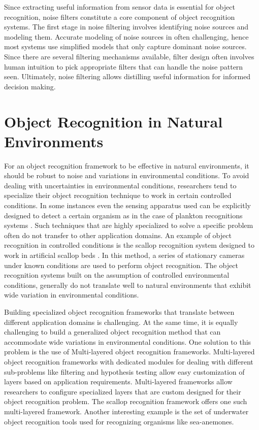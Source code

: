 \documentclass {udthesis}
\begin{document}
Since extracting useful information from sensor data is essential for object recognition, noise filters constitute a core component of object recognition systems. The first stage in noise filtering involves identifying noise sources and modeling them. Accurate modeling of noise sources in often challenging, hence most systems use simplified models that only capture dominant noise sources. Since there are several filtering mechanisms available, filter design often involves human intuition to pick appropriate filters that can handle the noise pattern seen. Ultimately, noise filtering allows distilling useful information for informed decision making.

\section{Object Recognition in Natural Environments}

For an object recognition framework to be effective in natural environments, it
should be robust to noise and variations in environmental conditions. 
To avoid dealing with uncertainties in environmental conditions, researchers tend to specialize their object recognition technique to work in certain controlled conditions. In some instances even the sensing apparatus used can be explicitly designed to detect a certain organism as in the case of plankton 
recognitions systems \cite{mcgavin_plankton, stelzer_rotifier}. 
Such techniques that are highly specialized to solve a specific problem 
often do not transfer to other application domains. An example of object recognition in controlled conditions is the scallop recognition system designed to work in artificial scallop beds \cite{enomoto9,enomoto10}. In this method, a series of stationary cameras under known conditions are used to perform object recognition. The object recognition systems built on the assumption of controlled environmental conditions, generally do not translate well to natural environments that exhibit wide variation in environmental conditions.

Building specialized object recognition frameworks that translate between different application domains is challenging. 
At the same time, it is equally challenging to build a generalized object recognition method that can accommodate wide variations in environmental conditions. 
One solution to this problem is the use of Multi-layered object recognition frameworks. Multi-layered object recognition frameworks with dedicated modules for dealing with different sub-problems like filtering and hypothesis testing allow easy customization of layers based on application requirements. 
Multi-layered frameworks allow researchers to configure specialized layers that are custom designed for their object recognition problem. The scallop
recognition framework \cite{prasanna_aslo, prasanna_igi} offers one such multi-layered framework. Another interesting example is the set of underwater object recognition tools \cite{schoening} used for recognizing organisms like sea-anemones.
\end{document}
